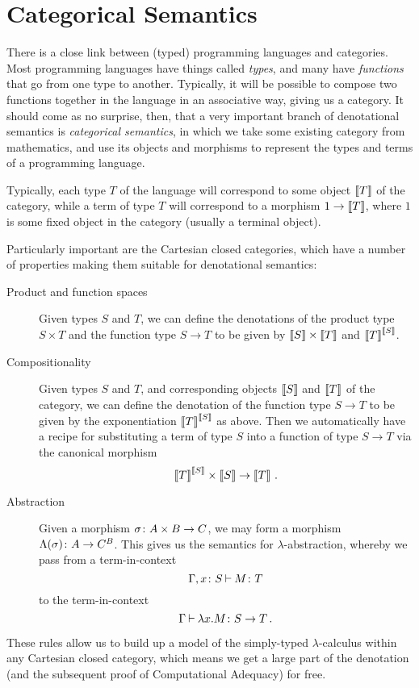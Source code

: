 \section{Categorical Semantics}
\label{SecCatSem}

There is a close link between (typed) programming languages and categories.
Most programming languages have things called \emph{types}, and many have \emph{functions} that go from one type to another. 
Typically, it will be possible to compose two functions together in the language in an associative way, giving us a category.
It should come as no surprise, then, that a very important branch of denotational semantics is \emph{categorical semantics}, in which we take some existing category from mathematics, and use its objects and morphisms to represent the types and terms of a programming language.

Typically, each type $T$ of the language will correspond to some object $\left\llbracket T\right\rrbracket$ of the category, while a term of type $T$ will correspond to a morphism $1 \to \left\llbracket T\right\rrbracket$, where $1$ is some fixed object in the category (usually a terminal object).

Particularly important \cite{Lambek} are the Cartesian closed categories, which have a number of properties making them suitable for denotational semantics:
\begin{description}
  \item[Product and function spaces] Given types $S$ and $T$, we can define the denotations of the product type $S \times T$ and the function type $S \to T$ to be given by $\left\llbracket S\right\rrbracket \times \left\llbracket T\right\rrbracket$ and ${\left\llbracket T\right\rrbracket}^{\left\llbracket S\right\rrbracket}$.
  \item[Compositionality] Given types $S$ and $T$, and corresponding objects $\left\llbracket S\right\rrbracket$ and $\left\llbracket T\right\rrbracket$ of the category, we can define the denotation of the function type $S \to T$ to be given by the exponentiation ${\left\llbracket T\right\rrbracket}^{\left\llbracket S\right\rrbracket}$ as above.
    Then we automatically have a recipe for substituting a term of type $S$ into a function of type $S\to T$ via the canonical morphism
    \[
      {\left\llbracket T\right\rrbracket}^{\left\llbracket S\right\rrbracket} \times \left\llbracket S\right\rrbracket \to \left\llbracket T\right\rrbracket\,.
      \]
  \item[Abstraction] Given a morphism $\sigma \colon A \times B \to C$, we may form a morphism $\Lambda(\sigma) \colon A \to C^B$.
    This gives us the semantics for $\lambda$-abstraction, whereby we pass from a term-in-context
    \[
      \Gamma,x\colon S \mathbin{\vdash} M \colon T
      \]
    to the term-in-context
    \[
      \Gamma \mathbin{\vdash} \lambda x.M\colon S \to T\,.
      \]
\end{description}
These rules allow us to build up a model of the simply-typed $\lambda$-calculus within any Cartesian closed category, which means we get a large part of the denotation (and the subsequent proof of Computational Adequacy) for free.  

